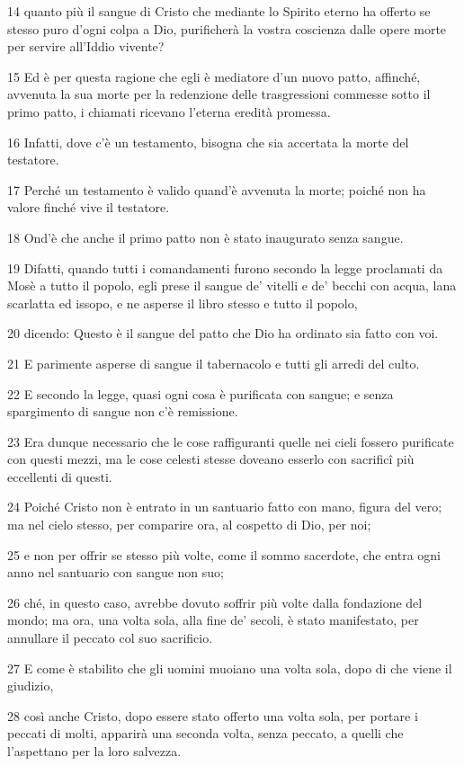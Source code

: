 \par 14 quanto più il sangue di Cristo che mediante lo Spirito eterno ha offerto se stesso puro d'ogni colpa a Dio, purificherà la vostra coscienza dalle opere morte per servire all'Iddio vivente?
\par 15 Ed è per questa ragione che egli è mediatore d'un nuovo patto, affinché, avvenuta la sua morte per la redenzione delle trasgressioni commesse sotto il primo patto, i chiamati ricevano l'eterna eredità promessa.
\par 16 Infatti, dove c'è un testamento, bisogna che sia accertata la morte del testatore.
\par 17 Perché un testamento è valido quand'è avvenuta la morte; poiché non ha valore finché vive il testatore.
\par 18 Ond'è che anche il primo patto non è stato inaugurato senza sangue.
\par 19 Difatti, quando tutti i comandamenti furono secondo la legge proclamati da Mosè a tutto il popolo, egli prese il sangue de' vitelli e de' becchi con acqua, lana scarlatta ed issopo, e ne asperse il libro stesso e tutto il popolo,
\par 20 dicendo: Questo è il sangue del patto che Dio ha ordinato sia fatto con voi.
\par 21 E parimente asperse di sangue il tabernacolo e tutti gli arredi del culto.
\par 22 E secondo la legge, quasi ogni cosa è purificata con sangue; e senza spargimento di sangue non c'è remissione.
\par 23 Era dunque necessario che le cose raffiguranti quelle nei cieli fossero purificate con questi mezzi, ma le cose celesti stesse doveano esserlo con sacrificî più eccellenti di questi.
\par 24 Poiché Cristo non è entrato in un santuario fatto con mano, figura del vero; ma nel cielo stesso, per comparire ora, al cospetto di Dio, per noi;
\par 25 e non per offrir se stesso più volte, come il sommo sacerdote, che entra ogni anno nel santuario con sangue non suo;
\par 26 ché, in questo caso, avrebbe dovuto soffrir più volte dalla fondazione del mondo; ma ora, una volta sola, alla fine de' secoli, è stato manifestato, per annullare il peccato col suo sacrificio.
\par 27 E come è stabilito che gli uomini muoiano una volta sola, dopo di che viene il giudizio,
\par 28 così anche Cristo, dopo essere stato offerto una volta sola, per portare i peccati di molti, apparirà una seconda volta, senza peccato, a quelli che l'aspettano per la loro salvezza.


